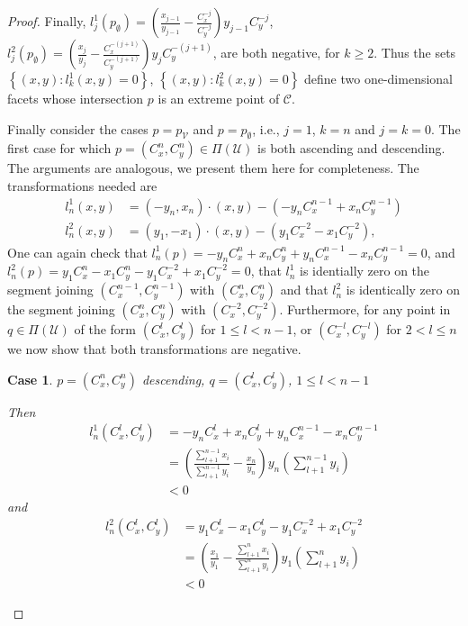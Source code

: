 \documentclass{article}
\theoremstyle{case}
\newtheorem{case}{Case}
\begin{document}
\begin{proof}
\noindent Finally, $l_j^1\left( p_{\emptyset}\right) = (\frac{x_{j-1}}{y_{j-1}} - \frac{C_x^{-j}}{C_y^{-j}})y_{j-1}C_y^{-j}$, $l_j^2\left( p_{\emptyset}\right) = (\frac{x_j}{y_j} - \frac{C_x^{-(j+1)}}{C_y^{-(j+1)}})y_jC_y^{-(j+1)}$, are both negative, for $k \geq 2$. Thus the sets $\left\lbrace \left( x,y\right) \colon l_k^1\left( x,y\right) = 0\right\rbrace$, $\left\lbrace \left( x,y\right) \colon l_k^2\left( x,y\right) = 0\right\rbrace$ define two one-dimensional facets whose intersection $p$ is an extreme point of $\mathcal{C}$.

Finally consider the cases $p = p_{\mathcal{V}}$ and $p = p_{\emptyset}$, i.e., $j = 1$, $k = n$ and  $j = k = 0$. The first case for which $p =\left( C_x^n, C_y^n \right) \in \Pi\left( \mathcal{U}\right)$ is both ascending and descending. The arguments are analogous, we present them here for completeness. The transformations needed are
\begin{align*}
l_n^1\left( x,y\right) &= \left( -y_n, x_n\right) \cdot \left( x,y\right) - \left( -y_nC_x^{n-1} + x_nC_y^{n-1}\right) \\
l_n^2\left( x,y\right) &= \left( y_1, -x_1\right) \cdot \left( x,y\right) - \left( y_1C_x^{-2} - x_1C_y^{-2}\right),
\end{align*}
One can again check that $l_n^1\left( p\right) = -y_nC_x^n + x_nC_y^n + y_nC_x^{n-1} - x_nC_y^{n-1} = 0$, and $l_n^2\left( p\right) = y_1C_x^n - x_1C_y^n - y_1C_x^{-2} + x_1C_y^{-2} = 0$, that $l_n^1$ is identially zero on the segment joining $\left( C_x^{n-1}, C_y^{n-1}\right)$ with $\left( C_x^n, C_y^n\right)$ and that $l_n^2$ is identically zero on the segment joining $\left( C_x^n, C_y^n\right)$ with $\left( C_x^{-2}, C_y^{-2}\right)$. Furthermore, for any point in $q \in \Pi(\mathcal{U})$ of the form $\left( C_x^l, C_y^l\right)$ for $1 \leq l < n-1$, or $\left( C_x^{-l}, C_y^{-l}\right)$ for $2 < l \leq n$ we now show that both transformations are negative.

%
%
\setcounter{case}{0}
\begin{case} $p = \left( C_x^n, C_y^n \right)$ descending, $q = \left( C_x^l, C_y^l\right)$, $1 \leq l < n-1$

\noindent Then
\begin{align*}
l_n^1\left( C_x^l, C_y^l\right) &= -y_nC_x^l + x_nC_y^l + y_nC_x^{n-1} - x_nC_y^{n-1} \\
&= \left( \frac{\sum_{l+1}^{n-1}x_i}{\sum_{l+1}^{n-1}y_i} - \frac{x_n}{y_n}\right) y_n\left( \sum_{l+1}^{n-1}y_i\right) \\
&< 0
\end{align*}
and
\begin{align*}
l_n^2\left( C_x^l, C_y^l\right) &= y_1C_x^l - x_1C_y^l - y_1C_x^{-2} + x_1C_y^{-2} \\
&= \left( \frac{x_1}{y_1} - \frac{\sum_{l+1}^n x_i}{\sum_{l+1}^n y_i}\right)y_1\left( \sum_{l+1}^n y_i\right) \\
&< 0
\end{align*}
\end{case}


\end{proof}
\end{document}
